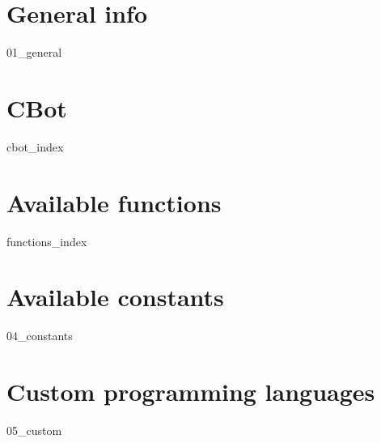\chapter{General info}
{01_general}

\chapter{CBot}
{cbot_index}

\chapter{Available functions}
{functions_index}

\chapter{Available constants}
{04_constants}

\chapter{Custom programming languages}
{05_custom}